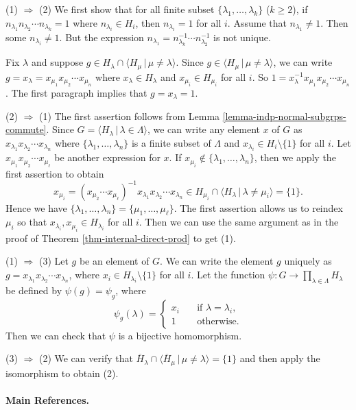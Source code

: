 \begin{sketch}
	(1) $\Rightarrow$ (2) We first show that for all finite subset $\{\lambda_1,\dots, \lambda_k\}$ ($k\geq 2$), if $n_{\lambda_1}n_{\lambda_2}\cdots n_{\lambda_k} = 1$ where $n_{\lambda_i}\in H_i$, then $n_{\lambda_i} = 1$ for all $i$. Assume that $n_{\lambda_1} \neq 1$. Then some $n_{\lambda_i}\neq 1$. But the expression $n_{\lambda_1} = n_{\lambda_k}^{-1} \cdots n_{\lambda_2}^{-1}$ is not unique.
	
	Fix $\lambda$ and suppose $g \in H_\lambda \cap \langle H_\mu\,|\, \mu \neq \lambda \rangle$. Since $g \in \langle H_\mu\,|\, \mu \neq \lambda \rangle $, we can write $g=x_{\lambda}  = x_{\mu_1} x_{\mu_2} \cdots x_{\mu_n}$ where $x_\lambda\in H_\lambda$ and  $x_{\mu_i} \in H_{\mu_i}$ for all $i$. So $1 = x_{\lambda}^{-1} x_{\mu_1} x_{\mu_2} \cdots x_{\mu_n}$. The first paragraph implies that $g = x_{\lambda} = 1$.
	
	
	(2) $\Rightarrow$ (1) The first assertion follows from Lemma \ref{lemma-indp-normal-subgrps-commute}. Since $G = \langle H_\lambda\,|\, \lambda \in \Lambda \rangle$, we can write any element $x$ of $G$  as $x_{\lambda_1} x_{\lambda_2} \cdots x_{\lambda_n}$ where $\{\lambda_1,\dots, \lambda_n\}$ is a finite subset of $\Lambda$ and $x_{\lambda_i} \in H_i\setminus\{1\}$ for all $i$. Let $x_{\mu_1} x_{\mu_2} \cdots x_{\mu_\ell}$ be another expression for $x$. If $x_{\mu_i} \not\in\{\lambda_1,\dots, \lambda_n\}$, then we apply the first assertion to obtain $$x_{\mu_i} = (x_{\mu_2} \cdots x_{\mu_\ell})^{-1}x_{\lambda_1} x_{\lambda_2} \cdots x_{\lambda_n} \in H_{\mu_i} \cap \langle H_\lambda\,|\, \lambda \neq \mu_i \rangle = \{1\}.$$ Hence we have $\{\lambda_1,\dots, \lambda_n\} = \{\mu_1,\dots, \mu_\ell\}$. The first assertion allows us to reindex $\mu_i$ so that $x_{\lambda_i},x_{\mu_i}\in H_{\lambda_i}$ for all $i$. Then we can use the same argument as in the proof of Theorem \ref{thm-internal-direct-prod} to get (1). 
	
	(1) $\Rightarrow$ (3)  Let $g$ be an element of $G$. We can write the element $g$ uniquely as $g = x_{\lambda_1} x_{\lambda_2} \cdots x_{\lambda_n}$, where $x_i \in H_{\lambda_i}\setminus\{1\}$ for all $i$. Let the function $\psi: G \rightarrow \prod_{\lambda\in\Lambda} H_\lambda$ be defined by $\psi(g) = \psi_g$, where
	\begin{equation*}
		\psi_g(\lambda) =  \begin{cases}
			x_i &\quad \text{if } \lambda = \lambda_i,
			\\
			1 &\quad \text{otherwise}.
		\end{cases}
	\end{equation*}Then we can check that $\psi$ is a bijective homomorphism.
	
	(3) $\Rightarrow$ (2) We can verify that $\overline{H}_\lambda \cap \langle \overline{H}_\mu\,|\, \mu \neq \lambda \rangle= \{1\}$ and then apply the isomorphism to obtain (2).
\end{sketch}

\paragraph{Main References.} \cite{Suzuki1982,Hungerford1974,Isaacs2009,Robinson1982}
